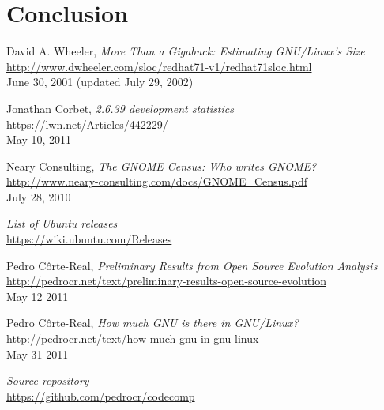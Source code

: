 \documentclass[11pt]{article}
\begin{document}
\section{Conclusion}

\newpage
\begin{thebibliography}{9}

David A. Wheeler,
\emph{More Than a Gigabuck: Estimating GNU/Linux's Size}\\
\url{http://www.dwheeler.com/sloc/redhat71-v1/redhat71sloc.html}\\
June 30, 2001 (updated July 29, 2002)

Jonathan Corbet,
\emph{2.6.39 development statistics}\\
\url{https://lwn.net/Articles/442229/}\\
May 10, 2011

Neary Consulting,
\emph{The GNOME Census: Who writes GNOME?}\\
\url{http://www.neary-consulting.com/docs/GNOME_Census.pdf}\\
July 28, 2010


\emph{List of Ubuntu releases}\\
\url{https://wiki.ubuntu.com/Releases}

Pedro Côrte-Real,
\emph{Preliminary Results from Open Source Evolution Analysis}\\
\url{http://pedrocr.net/text/preliminary-results-open-source-evolution}\\
May 12 2011

Pedro Côrte-Real,
\emph{How much GNU is there in GNU/Linux?}\\
\url{http://pedrocr.net/text/how-much-gnu-in-gnu-linux}\\
May 31 2011

\emph{Source repository}\\
\url{https://github.com/pedrocr/codecomp}

\end{thebibliography}
\end{document}
